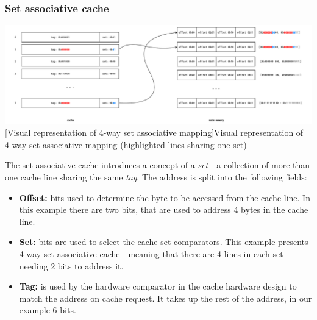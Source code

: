 \subsubsection{Set associative cache}
\begin{center}
	\centering
	\includegraphics[width=\textwidth]{figures/02-background/set_ass_mem.pdf}
	[Visual representation of 4-way set associative mapping]{Visual representation of 4-way set associative mapping (highlighted lines sharing one set)}
	\label{fig:set_ass_mem}
\end{center}

\noindent The set associative cache introduces a concept of a \textit{set} - a collection of more than one cache line sharing the same \textit{tag}. The address is split into the following fields:

\begin{itemize}
	\item \textbf{Offset:} bits used to determine the byte to be accessed from the cache line. In this example there are two bits, that are used to address 4 bytes in the cache line.
	\item \textbf{Set:} bits are used to select the cache set comparators. This example presents 4-way set associative cache - meaning that there are 4 lines
		in each set - needing 2 bits to address it.
	\item \textbf{Tag:} is used by the hardware comparator in the cache hardware design to match the address on cache request. It takes up the rest of the address, in our example 6 bits.
\end{itemize}

